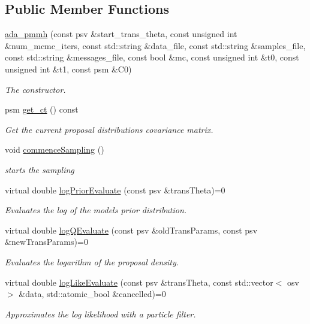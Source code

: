 \subsection*{Public Member Functions}
\begin{DoxyCompactItemize}
\item 
\hyperlink{classada__pmmh_a9e8c52947fd34c7d75f3397d64f586e4}{ada\+\_\+pmmh} (const psv \&start\+\_\+trans\+\_\+theta, const unsigned int \&num\+\_\+mcmc\+\_\+iters, const std\+::string \&data\+\_\+file, const std\+::string \&samples\+\_\+file, const std\+::string \&messages\+\_\+file, const bool \&mc, const unsigned int \&t0, const unsigned int \&t1, const psm \&C0)
\begin{DoxyCompactList}\small\item\em The constructor. \end{DoxyCompactList}\item 
psm \hyperlink{classada__pmmh_ae8cbd73ca691b9ad464c00ff666a8b48}{get\+\_\+ct} () const
\begin{DoxyCompactList}\small\item\em Get the current proposal distribution\textquotesingle{}s covariance matrix. \end{DoxyCompactList}\item 
\mbox{\label{classada__pmmh_a06aeab11ff56e6d1d3c886e7ac2980f7}} 
void \hyperlink{classada__pmmh_a06aeab11ff56e6d1d3c886e7ac2980f7}{commence\+Sampling} ()
\begin{DoxyCompactList}\small\item\em starts the sampling \end{DoxyCompactList}\item 
virtual double \hyperlink{classada__pmmh_a249575415a567c4f62e62e9864abd867}{log\+Prior\+Evaluate} (const psv \&trans\+Theta)=0
\begin{DoxyCompactList}\small\item\em Evaluates the log of the model\textquotesingle{}s prior distribution. \end{DoxyCompactList}\item 
virtual double \hyperlink{classada__pmmh_a64274a7a1a54b99fb10e53f3b09925eb}{log\+Q\+Evaluate} (const psv \&old\+Trans\+Params, const psv \&new\+Trans\+Params)=0
\begin{DoxyCompactList}\small\item\em Evaluates the logarithm of the proposal density. \end{DoxyCompactList}\item 
virtual double \hyperlink{classada__pmmh_ae07210fc64b1966cef4d5a594be687f1}{log\+Like\+Evaluate} (const psv \&trans\+Theta, const std\+::vector$<$ osv $>$ \&data, std\+::atomic\+\_\+bool \&cancelled)=0
\begin{DoxyCompactList}\small\item\em Approximates the log likelihood with a particle filter. \end{DoxyCompactList}\end{DoxyCompactItemize}
